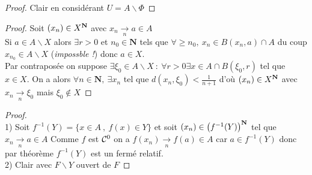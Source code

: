 		\newpage
		
		
		\begin{proof}
		Clair en considérant $U = A\backslash \Phi$
		\end{proof} \medskip
		
		
		\begin{proof}
		\fbox{$\Rightarrow$} Soit $(x_n)\in X^{\mathbf{N}}$ avec $x_n\underset{n}{\to} a\in A$\\ Si $a\in A\backslash X$ alors 
		$\exists r>0$ et $n_0\in \mathbf{N}$ tels que $\forall \geq n_0 ,~ x_n\in B(x_n,a)\cap A$ 
		du coup $x_{n_0} \in A\backslash X$ (\emph{impossble !}) donc $a\in X$.\\
		\fbox{$\Leftarrow$} Par contraposée on suppose $\exists \xi_0 \in A\backslash X ~:~ \forall r>0\exists x\in A\cap B(\xi_0,r)$ 
		tel que $x\in X$. On a alors $\forall n\in \mathbf{N} ,~\exists x_n$ tel que $d(x_n,\xi_0)<\frac{1}{n+1}$ 
		d'où $(x_n) \in X^{\mathbf{N}}$ avec $x_n \underset{n}{\to} \xi_0$ mais $\xi_0\notin X$
		\end{proof} \medskip
		
		
		\begin{proof} ~\\
		{\small 1)} Soit $f^{-1} (Y) = \{x\in A ~,~f(x)\in Y\}$ et soit $(x_n) \in \left( f^{-1} (Y)\right)^{\mathbf{N}}$ 
		tel que $x_n \underset{n}{\to} a\in A$ Comme $f$ est ${\mathcal{C}}^0$ on a $f(x_n) \underset{n}{\to} f(a) \in A$ car $a\in f^{-1}(Y)$
		donc par théorème $f^{-1} (Y)$ est un fermé relatif.\\ 
		{\small 2)} Clair avec $F\backslash Y$ ouvert de $F$
		\end{proof} \medskip
		
